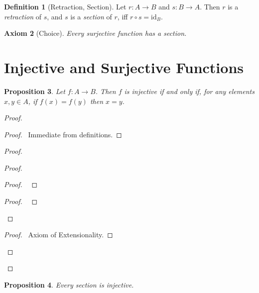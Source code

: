 \documentclass{book}
\let\qed\relax
\newtheorem{ax}{Axiom}[chapter]
\newtheorem{prop}[ax]{Proposition}
\theoremstyle{definition}
\newtheorem{df}[ax]{Definition}
\newcommand{\id}[1]{\ensuremath{\mathrm{id}_{#1}}}
\begin{document}
\begin{df}[Retraction, Section]
Let $r : A \rightarrow B$ and $s : B \rightarrow A$. Then $r$ is a \emph{retraction} of $s$, and $s$ is a \emph{section} of $r$, iff $r \circ s = \id{B}$.
\end{df}

\begin{ax}[Choice]
Every surjective function has a section.
\end{ax}

\section{Injective and Surjective Functions}

\begin{prop}
Let $f : A \rightarrow B$. Then $f$ is injective if and only if, for any elements $x,y \in A$, if $f(x) = f(y)$ then $x = y$.
\end{prop}

\begin{proof}
\pf
{}
\begin{proof}
	\pf\ Immediate from definitions.
\end{proof}
\begin{proof}
	\begin{proof}
		\begin{proof}
			\pf\ 
		\end{proof}
		\begin{proof}
			\pf\ 
		\end{proof}
	\end{proof}
	\begin{proof}
		\pf\ Axiom of Extensionality.
	\end{proof}
\end{proof}
\qed
\end{proof}

\begin{prop}
Every section is injective.
\end{prop}
\end{document}
